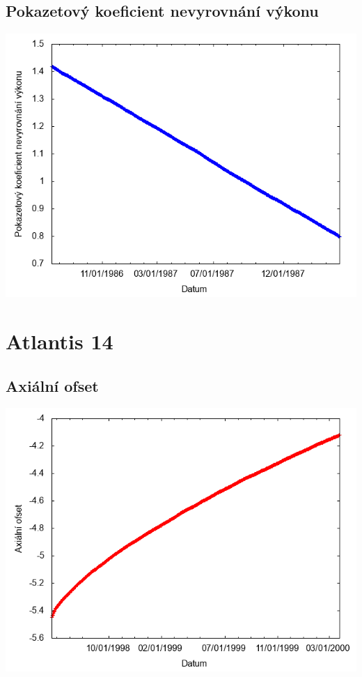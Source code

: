 \documentclass[a4paper,twoside,11pt]{article}
\begin{document}
\subsection*{Pokazetový koeficient nevyrovnání výkonu}
\begin{center}
\includegraphics[width=.8\textwidth]{graphs/Atlantis_13_fha.png}
\end{center}

\newpage
\section*{Atlantis 14}
\subsection*{Axiální ofset}
\begin{center}
\includegraphics[width=.8\textwidth]{graphs/Atlantis_14_ao.png}
\end{center}
\end{document}
